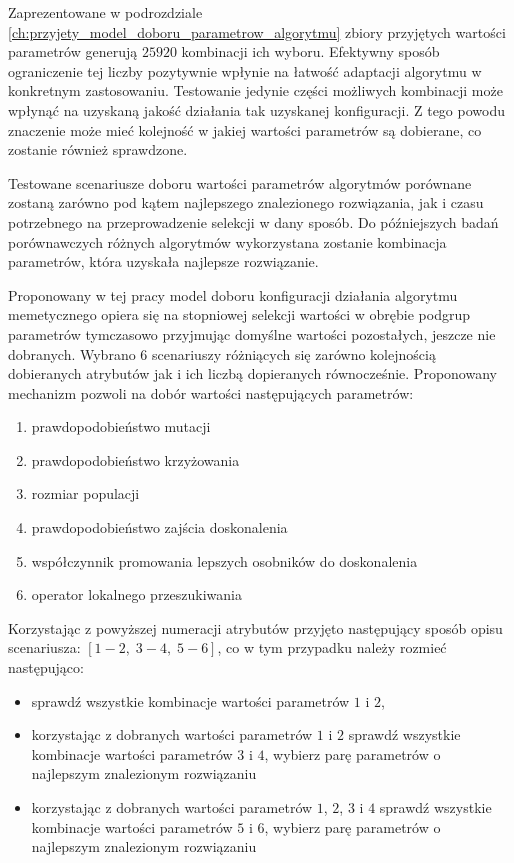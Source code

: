 \par
Zaprezentowane w podrozdziale \ref{ch:przyjety_model_doboru_parametrow_algorytmu} zbiory przyjętych wartości parametrów generują $25920$ kombinacji ich wyboru. Efektywny sposób ograniczenie tej liczby pozytywnie wpłynie na łatwość adaptacji algorytmu w konkretnym zastosowaniu. Testowanie jedynie części możliwych kombinacji może wpłynąć na uzyskaną jakość działania tak uzyskanej konfiguracji. Z tego powodu znaczenie może mieć kolejność w jakiej wartości parametrów są dobierane, co zostanie również sprawdzone. 
\par
Testowane scenariusze doboru wartości parametrów algorytmów porównane zostaną zarówno pod kątem najlepszego znalezionego rozwiązania, jak i czasu potrzebnego na przeprowadzenie selekcji w dany sposób. Do późniejszych badań porównawczych różnych algorytmów wykorzystana zostanie kombinacja parametrów, która uzyskała najlepsze rozwiązanie. 
\par
Proponowany w tej pracy model doboru konfiguracji działania algorytmu memetycznego opiera się na stopniowej selekcji wartości w obrębie podgrup parametrów tymczasowo przyjmując domyślne wartości pozostałych, jeszcze nie dobranych. Wybrano 6 scenariuszy różniących się zarówno kolejnością dobieranych atrybutów jak i ich liczbą dopieranych równocześnie. Proponowany mechanizm pozwoli na dobór wartości następujących parametrów:
\begin{enumerate}
\item prawdopodobieństwo mutacji
\item prawdopodobieństwo krzyżowania
\item rozmiar populacji
\item prawdopodobieństwo zajścia doskonalenia
\item współczynnik promowania lepszych osobników do doskonalenia
\item operator lokalnego przeszukiwania
\end{enumerate}
Korzystając z powyższej numeracji atrybutów przyjęto następujący sposób opisu scenariusza: $[1-2,\; 3-4,\; 5-6]$, co w tym przypadku należy rozmieć następująco:
\begin{itemize}
\item sprawdź wszystkie kombinacje wartości parametrów $1$ i $2$, 
\item korzystając z dobranych wartości parametrów $1$ i $2$ sprawdź wszystkie kombinacje wartości parametrów $3$ i $4$, wybierz parę parametrów o najlepszym znalezionym rozwiązaniu
\item korzystając z dobranych wartości parametrów $1$, $2$, $3$ i $4$ sprawdź wszystkie kombinacje wartości parametrów $5$ i $6$, wybierz parę parametrów o najlepszym znalezionym rozwiązaniu
\end{itemize}
